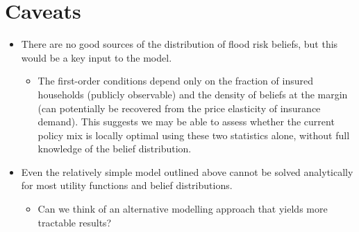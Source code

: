 \documentclass[12pt]{article}
\begin{document}
\section{Caveats}
\begin{itemize}
    \item There are no good sources of the distribution of flood risk beliefs, but this would be a key input to the model.
    \begin{itemize}
        \item The first-order conditions depend only on the fraction of insured households (publicly observable) and the density of beliefs at the margin (can potentially be recovered from the price elasticity of insurance demand). This suggests we may be able to assess whether the current policy mix is locally optimal using these two statistics alone, without full knowledge of the belief distribution.
    \end{itemize}
    \item Even the relatively simple model outlined above cannot be solved analytically for most utility functions and belief distributions.
    \begin{itemize}
        \item Can we think of an alternative modelling approach that yields more tractable results? 
    \end{itemize}
\end{itemize}
\end{document}

